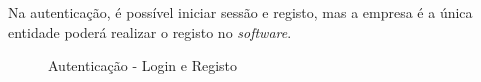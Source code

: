 Na autenticação, é possível iniciar sessão e registo, mas a empresa é a única entidade poderá realizar o registo no \textit{software}.

\begin{figure}[htb]%
    \centering
    \qquad
    \caption{Autenticação - Login e Registo}%
    \label{fig:24}
\end{figure}

